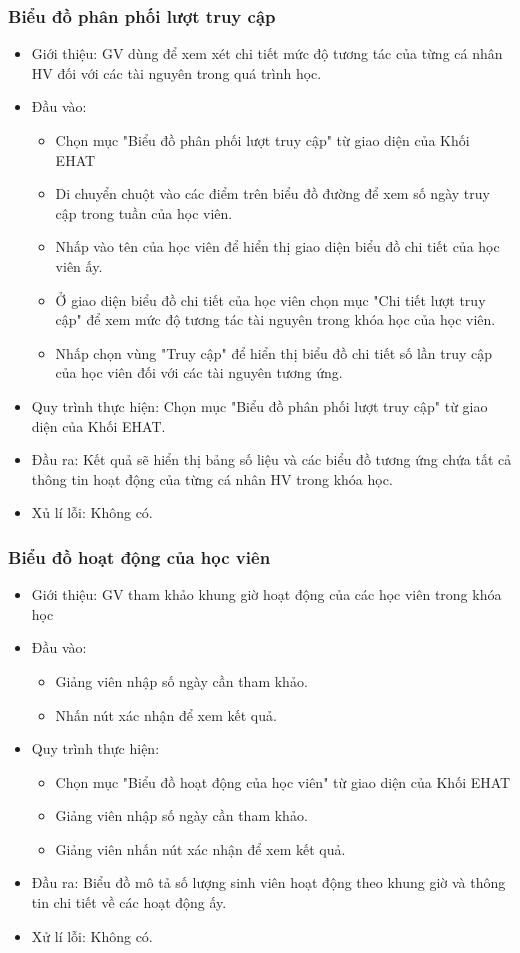 \subsubsection{Biểu đồ phân phối lượt truy cập}
\begin{itemize}
	\item Giới thiệu: GV dùng để xem xét chi tiết mức độ tương tác của từng cá nhân HV đối với các tài nguyên trong quá trình học.
	\item Đầu vào: 
	\begin{itemize}
		\item Chọn mục "Biểu đồ phân phối lượt truy cập" từ giao diện của Khối EHAT
		\item Di chuyển chuột vào các điểm trên biểu đồ đường để xem số ngày truy cập trong tuần của học viên.
		\item Nhấp vào tên của học viên để hiển thị giao diện biểu đồ chi tiết của học viên ấy.
		\item Ở giao diện biểu đồ chi tiết của học viên chọn mục "Chi tiết lượt truy cập" để xem mức độ tương tác tài nguyên trong khóa học của học viên.
		\item Nhấp chọn vùng "Truy cập" để hiển thị biểu đồ chi tiết số lần truy cập của học viên đối với các tài nguyên tương ứng.
	\end{itemize}
	\item Quy trình thực hiện: Chọn mục "Biểu đồ phân phối lượt truy cập" từ giao diện của Khối EHAT.
	\item Đầu ra: Kết quả sẽ hiển thị bảng số liệu và các biểu đồ tương ứng chứa tất cả thông tin hoạt động của từng cá nhân HV trong khóa học.
	\item Xủ lí lỗi: Không có.
\end{itemize}

\subsubsection{Biểu đồ hoạt động của học viên}
\begin{itemize}
	\item Giới thiệu: GV tham khảo khung giờ hoạt động của các học viên trong khóa học
	\item Đầu vào: 
	\begin{itemize}
		\item Giảng viên nhập số ngày cần tham khảo.
		\item Nhấn nút xác nhận để xem kết quả.
	\end{itemize}
	\item Quy trình thực hiện:
	\begin{itemize}
		\item Chọn mục "Biểu đồ hoạt động của học viên" từ giao diện của Khối EHAT
		\item Giảng viên nhập số ngày cần tham khảo.
		\item Giảng viên nhấn nút xác nhận để xem kết quả.
	\end{itemize}
	\item Đầu ra: Biểu đồ mô tả số lượng sinh viên hoạt động theo khung giờ và thông tin chi tiết về các hoạt động ấy.
	\item Xử lí lỗi: Không có.
\end{itemize}

